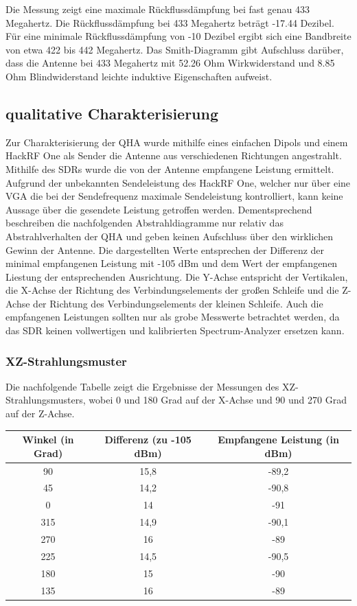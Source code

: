 Die Messung zeigt eine maximale Rückflussdämpfung bei fast genau 433 Megahertz. Die Rückflussdämpfung bei 433 Megahertz beträgt -17.44 Dezibel. Für eine minimale Rückflussdämpfung von -10 Dezibel ergibt sich eine Bandbreite von etwa 422 bis 442 Megahertz. Das Smith-Diagramm gibt Aufschluss darüber, dass die Antenne bei 433 Megahertz mit 52.26 Ohm Wirkwiderstand und 8.85 Ohm Blindwiderstand leichte induktive Eigenschaften aufweist.

\subsection{qualitative Charakterisierung}
Zur Charakterisierung der QHA wurde mithilfe eines einfachen Dipols und einem HackRF One als Sender die Antenne aus verschiedenen Richtungen angestrahlt. Mithilfe des SDRs wurde die von der Antenne empfangene Leistung ermittelt. Aufgrund der unbekannten Sendeleistung des HackRF One, welcher nur über eine VGA die bei der Sendefrequenz maximale Sendeleistung kontrolliert, kann keine Aussage über die gesendete Leistung getroffen werden. Dementsprechend beschreiben die nachfolgenden Abstrahldiagramme nur relativ das Abstrahlverhalten der QHA und geben keinen Aufschluss über den wirklichen Gewinn der Antenne. Die dargestellten Werte entsprechen der Differenz der minimal empfangenen Leistung mit -105 dBm und dem Wert der empfangenen Liestung der entsprechenden Ausrichtung. Die Y-Achse entspricht der Vertikalen, die X-Achse der Richtung des Verbindungselements der großen Schleife und die Z-Achse der Richtung des Verbindungselements der kleinen Schleife. Auch die empfangenen Leistungen sollten nur als grobe Messwerte betrachtet werden, da das SDR keinen vollwertigen und kalibrierten Spectrum-Analyzer ersetzen kann. 

\subsubsection{XZ-Strahlungsmuster}
Die nachfolgende Tabelle zeigt die Ergebnisse der Messungen des XZ-Strahlungsmusters, wobei 0 und 180 Grad auf der X-Achse und 90 und 270 Grad auf der Z-Achse.

\begin{tabular}{|c|c|c|}
	\hline
	\textbf{Winkel (in Grad)} & \textbf{Differenz (zu -105 dBm)} & \textbf{Empfangene Leistung (in dBm)} \\
	\hline
	90 & 15,8 & -89,2 \\
	\hline
	45 & 14,2 & -90,8 \\
	\hline
	0 & 14 & -91 \\
	\hline
	315 & 14,9 & -90,1 \\
	\hline
	270 & 16 & -89 \\
	\hline
	225 & 14,5 & -90,5 \\
	\hline
	180 & 15 & -90 \\
	\hline
	135 & 16 & -89 \\
	\hline
\end{tabular}

